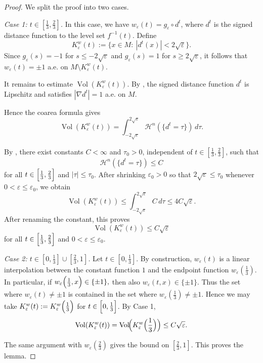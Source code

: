 \documentclass[12pt,english]{article}
\theoremstyle{definition}
\begin{document}
\begin{proof}
We split the proof into two cases.

\noindent\emph{Case 1: \(t\in[\frac13,\frac23]\).}
In this case, we have $w_\varepsilon(t)=g_\varepsilon\circ d^t$, where \(d^t\) is the signed distance function to the level set \(f^{-1}(t)\). Define
\[
K_\varepsilon^w(t):=\{x\in M:\ |d^t(x)|<2\sqrt\varepsilon\}.
\]
Since $g_\varepsilon(s)=-1$ for $s\le -2\sqrt\varepsilon$ and $g_\varepsilon(s)=1$ for $s\ge 2\sqrt\varepsilon$, it follows that $w_\varepsilon(t)=\pm1$ a.e. on $M\setminus K_\varepsilon^w(t)$.

It remains to estimate \(\operatorname{Vol}(K_\varepsilon^w(t))\). By \cite[Proposition~9.1]{Gua18},
the signed distance function \(d^t\) is Lipschitz and satisfies $|\nabla d^t|=1$ a.e. on $M$.

Hence the coarea formula gives
\[
\operatorname{Vol}(K_\varepsilon^w(t))
=
\int_{-2\sqrt\varepsilon}^{2\sqrt\varepsilon}\mathcal H^n(\{d^t=\tau\})\,d\tau.
\]

By \cite[Section 9]{Gua18}, there exist constants \(C<\infty\)
and \(\tau_0>0\), independent of \(t\in[\frac13,\frac23]\), such that
\[
\mathcal H^n(\{d^t=\tau\})\le C
\]
for all $t\in\Bigl[\frac13,\frac23\Bigr]$ and $|\tau|\le \tau_0$. After shrinking \(\varepsilon_0>0\) so that \(2\sqrt\varepsilon\le \tau_0\) whenever
\(0<\varepsilon\le \varepsilon_0\), we obtain
\[
\operatorname{Vol}(K_\varepsilon^w(t))
\le
\int_{-2\sqrt\varepsilon}^{2\sqrt\varepsilon} C\,d\tau
\le 4C\sqrt\varepsilon.
\]
After renaming the constant, this proves
\[
\operatorname{Vol}(K_\varepsilon^w(t))\le C\sqrt\varepsilon
\]
for all $t\in\Bigl[\frac13,\frac23\Bigr]$ and $0<\varepsilon\le \varepsilon_0$.

\noindent\emph{Case 2: \(t\in[0,\frac13]\cup[\frac23,1]\).}
Let \(t\in[0,\frac13]\). By construction, \(w_\varepsilon(t)\) is a linear interpolation between the constant function \(1\)
and the endpoint function \(w_\varepsilon(\frac13)\). In particular, if $w_\varepsilon\Bigl(\frac13,x\Bigr)\in\{\pm1\},$ then also $w_\varepsilon(t,x)\in\{\pm1\}.$ Thus the set where \(w_\varepsilon(t)\neq\pm1\) is contained in the set where \(w_\varepsilon(\frac13) \neq \pm 1\). Hence we may take $K_\varepsilon^w(t):=K_\varepsilon^w\Bigl(\frac13\Bigr)$ for $t\in\Bigl[0,\frac13\Bigr]$. By Case 1,
\[
\operatorname{Vol}(K_\varepsilon^w(t))
=
\operatorname{Vol}\!\Bigl(K_\varepsilon^w\Bigl(\frac13\Bigr)\Bigr)
\le C\sqrt\varepsilon.
\]

The same argument with \(w_\varepsilon(\frac23)\) gives the bound on \([\frac23,1]\). This proves the lemma.
\end{proof}
\end{document}
